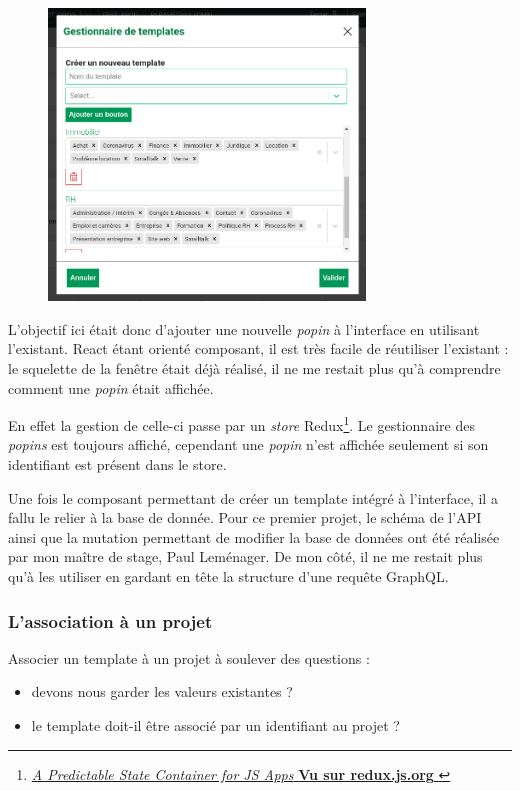 \documentclass[12pt,a4paper,oneside]{scrreprt}
\begin{document}
\begin{figure}[!ht]
\centering
	\includegraphics[width=0.75\textwidth]{pictures/popin_create_templates.png}
\end{figure}

L'objectif ici était donc d'ajouter une nouvelle \textit{popin} à l'interface en utilisant l'existant. React étant orienté composant, il est très facile de réutiliser l'existant : le squelette de la fenêtre était déjà réalisé, il ne me restait plus qu'à comprendre comment une \textit{popin} était affichée.

En effet la gestion de celle-ci passe par un \textit{store} Redux\footnote{\href{https://redux.js.org}{\og\textit{A Predictable State Container for JS Apps}\fg{} \textbf{Vu sur redux.js.org} }}. Le gestionnaire des \textit{popins} est toujours affiché, cependant une \textit{popin} n'est affichée seulement si son identifiant est présent dans le store.

Une fois le composant permettant de créer un template intégré à l'interface, il a fallu le relier à la base de donnée. Pour ce premier projet, le schéma de l'API ainsi que la mutation permettant de modifier la base de données ont été réalisée par mon maître de stage, Paul Leménager. De mon côté, il ne me restait plus qu'à les utiliser en gardant en tête la structure d'une requête GraphQL.

\subsubsection{L'association à un projet}

Associer un template à un projet à soulever des questions :
\begin{itemize}
	\item devons nous garder les valeurs existantes ?
	\item le template doit-il être associé par un identifiant au projet ?
\end{itemize}
\end{document}
